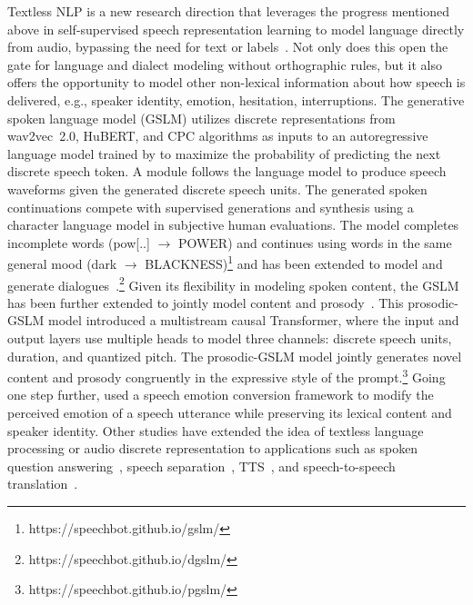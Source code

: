Textless NLP is a new research direction that leverages the progress mentioned
above in self-supervised speech representation learning to model language
directly from audio, bypassing the need for text or 
labels~\parencite{nguyen_generative_2022,polyak_speech_2021,kharitonov_textfree_2021,kreuk_textless_2022}. 
Not only does this open the gate for language and dialect modeling without
orthographic rules, but it also offers the opportunity to model other
non-lexical information about how speech is delivered, e.g., speaker identity,
emotion, hesitation, interruptions. 
The generative spoken language model (GSLM) \parencite{nguyen_generative_2022} utilizes discrete
representations from wav2vec~2.0, HuBERT, and CPC algorithms as inputs to an
autoregressive language model trained by  to maximize the
probability of predicting the next discrete speech token. A  module
follows the language model to produce speech waveforms given the generated
discrete speech units. The generated spoken continuations compete with
supervised generations and synthesis using a character language model in
subjective human evaluations. The model completes incomplete words
(pow[..] $\rightarrow$ POWER) and continues using words in the same general mood (dark $\rightarrow$
BLACKNESS)\footnote{https://speechbot.github.io/gslm/} and has been extended to
model and generate
dialogues~\parencite{nguyen_generative_2022}.\footnote{https://speechbot.github.io/dgslm/}
Given its flexibility in modeling spoken content, the GSLM has been further extended
to jointly model content and prosody~\parencite{kharitonov_textfree_2021}. This prosodic-GSLM model
introduced a multistream causal Transformer, where the input and output layers
use multiple heads to model three channels:  discrete speech units, duration,
and quantized pitch. The prosodic-GSLM model jointly generates novel content
and prosody congruently in the expressive 
style of the prompt.\footnote{https://speechbot.github.io/pgslm/}
Going one step further, \parencite{kreuk_textless_2022} used a speech emotion
conversion framework to modify the perceived emotion of a speech utterance
while preserving its lexical content and speaker identity. Other studies have
extended the idea of textless language processing or audio discrete representation to applications such as 
spoken question answering~\parencite{lin_dual_2022}, speech separation~\parencite{shi_discretization_2022}, TTS~\parencite{hayashi_discretalk_2020}, and speech-to-speech
translation~\parencite{lee_textless_2022}.




